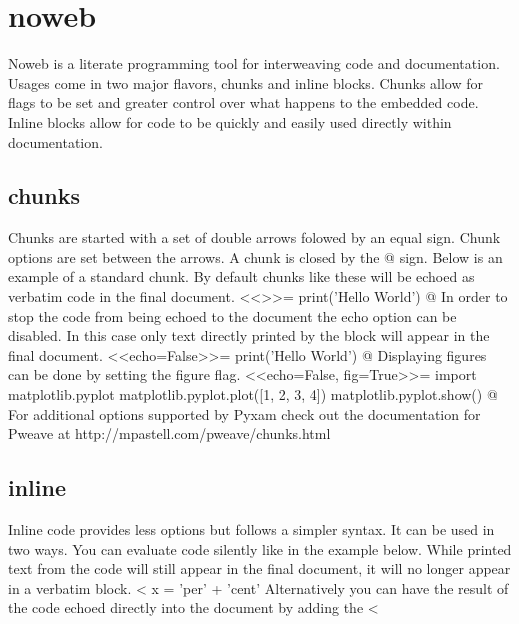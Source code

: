 \documentclass[12pt]{exam}
\begin{document}
    \section*{noweb}
        Noweb is a literate programming tool for interweaving code and documentation. Usages come in two major flavors,
        chunks and inline blocks. Chunks allow for flags to be set and greater control over what happens to the embedded
        code. Inline blocks allow for code to be quickly and easily used directly within documentation.
        \subsection*{chunks}
            Chunks are started with a set of double arrows folowed by an equal sign. Chunk options are set between the
            arrows. A chunk is closed by the @ sign. Below is an example of a standard chunk. By default chunks like
            these will be echoed as verbatim code in the final document.
<<>>=
print('Hello World')
@
            In order to stop the code from being echoed to the document the echo option can be disabled. In this case
            only text directly printed by the block will appear in the final document.
<<echo=False>>=
print('Hello World')
@
            Displaying figures can be done by setting the figure flag.
<<echo=False, fig=True>>=
import matplotlib.pyplot
matplotlib.pyplot.plot([1, 2, 3, 4])
matplotlib.pyplot.show()
@
            For additional options supported by Pyxam check out the documentation for Pweave at
            http://mpastell.com/pweave/chunks.html
        \subsection*{inline}
            Inline code provides less options but follows a simpler syntax. It can be used in two ways. You can
            evaluate code silently like in the example below. While printed text from the code will still appear in the
            final document, it will no longer appear in a verbatim block.
<%
x = 'per' + 'cent'
            Alternatively you can have the result of the code echoed directly into the document by adding the
            <%
\end{document}
